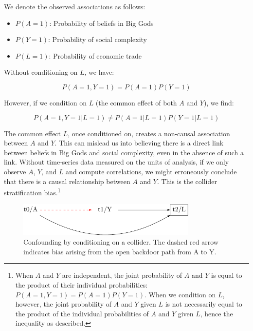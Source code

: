 \documentclass[
  singlecolumn]{report}
\providecommand{\tightlist}{%
  \setlength{\itemsep}{0pt}\setlength{\parskip}{0pt}}\usepackage{longtable,booktabs,array}
\begin{document}
We denote the observed associations as follows:

\begin{itemize}
\tightlist
\item
  \(P(A = 1)\): Probability of beliefs in Big Gods
\item
  \(P(Y = 1)\): Probability of social complexity
\item
  \(P(L = 1)\): Probability of economic trade
\end{itemize}

Without conditioning on \(L\), we have:

\[P(A = 1, Y = 1) = P(A = 1)P(Y = 1)\]

However, if we condition on \(L\) (the common effect of both \(A\) and
\(Y\)), we find:

\[P(A = 1, Y = 1 | L = 1) \neq P(A = 1 | L = 1)P(Y = 1 | L = 1)\]

The common effect \(L\), once conditioned on, creates a non-causal
association between \(A\) and \(Y\). This can mislead us into believing
there is a direct link between beliefs in Big Gods and social
complexity, even in the absence of such a link. Without time-series data
measured on the units of analysis, if we only observe \(A\), \(Y\), and
\(L\) and compute correlations, we might erroneously conclude that there
is a causal relationship between \(A\) and \(Y\). This is the collider
stratification bias.\footnote{When \(A\) and \(Y\) are independent, the
  joint probability of \(A\) and \(Y\) is equal to the product of their
  individual probabilities: \(P(A = 1, Y = 1) = P(A = 1)P(Y = 1)\). When
  we condition on \(L\), however, the joint probability of \(A\) and
  \(Y\) given \(L\) is not necessarily equal to the product of the
  individual probabilities of \(A\) and \(Y\) given \(L\), hence the
  inequality as described.}

\begin{figure}

{\centering \includegraphics[width=0.8\textwidth,height=\textheight]{causal-dags_files/figure-pdf/fig-dag-common-effect-1.pdf}

}

\caption{\label{fig-dag-common-effect}Confounding by conditioning on a
collider. The dashed red arrow indicates bias arising from the open
backdoor path from A to Y.}

\end{figure}
\end{document}

